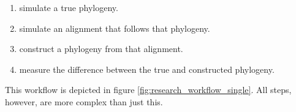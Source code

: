 \begin{enumerate}[label=\arabic*)]\itemsep2pt
  \item simulate a true phylogeny.
  \item simulate an alignment that follows that phylogeny.
  \item construct a phylogeny from that alignment.
  \item measure the difference between the true and constructed phylogeny.
\end{enumerate}

This workflow is depicted in figure \ref{fig:research_workflow_single}.
All steps, however, are more complex than just this.

